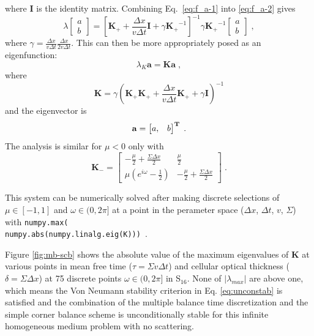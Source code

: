 where $\bm{I}$ is the identity matrix. Combining Eq.~\eqref{eq:f_a-1} into \eqref{eq:f_a-2} gives
\begin{equation}
    \lambda
    \begin{bmatrix}
        a \\b
    \end{bmatrix}
    = \left[ \bm{K_{+}} + \frac{\Delta x}{v\Delta t} \bm{I} + \gamma\bm{K_{+}}^{-1} \right]^{-1} \gamma \bm{K_{+}}^{-1}
    \begin{bmatrix}
        a \\ b
    \end{bmatrix} \; ,
\end{equation}
where $\gamma = \frac{\Delta x}{v\Delta t}  \frac{\Delta x}{2v\Delta t}$.
This can then be more appropriately posed as an eigenfunction:
\begin{equation}
    \lambda_K
    \bm{a}
    = \bm{K} \bm{a}\;,
\end{equation}
where
\begin{equation}
    \bm{K} = \gamma \left( \bm{K_{+}}\bm{K_{+}} + \frac{\Delta x}{v \Delta t}\bm{K_{+}} + \gamma \bm{I}\right)^{-1}
\end{equation}
and the eigenvector is
\begin{equation}
    \bf{a} = \begin{bmatrix}
        a, & b
    \end{bmatrix} ^T \;.
\end{equation}
The analysis is similar for $\mu<0$ only with
\begin{equation}
    \bm{K_{-}} = \begin{bmatrix}
        -\frac{\mu}{2} + \frac{\Sigma\Delta x}{2} & \frac{\mu}{2} \\
        \mu \left ( e^{i\omega} - \frac{1}{2} \right) & -\frac{\mu}{2} + \frac{\Sigma\Delta x}{2} 
    \end{bmatrix} \;.
\end{equation}

This system can be numerically solved after making discrete selections of $\mu \in [-1, 1]$ and $\omega \in (0,2\pi]$ at a point in the perameter space ($\Delta x$, $\Delta t$, $v$, $\Sigma$) with \texttt{numpy.max(\\numpy.abs(numpy.linalg.eig(K)))}~\cite{harris2020array}.

Figure \ref{fig:mb-scb} shows the absolute value of the maximum eigenvalues of $\bm{K}$ at various points in mean free time ($\tau=\Sigma v\Delta t$) and cellular optical thickness ($\delta=\Sigma\Delta x$) at 75 discrete points $\omega \in (0,2\pi]$ in S$_{16}$.
None of $|\lambda_{max}|$ are above one, which means the Von Neumann stability criterion in Eq. \eqref{eq:unconstab} is satisfied and the combination of the multiple balance time discretization and the simple corner balance scheme is unconditionally stable for this infinite homogeneous medium problem with no scattering.

